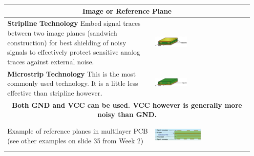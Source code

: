 		\begin{table}[h!]
		\centering
		\begin{tabular}{|m{}|m{}|}
				\multicolumn{2}{c}{\textbf{Image or Reference Plane}}
			\\
			\hline
				\textbf{Stripline Technology}\newline
				Embed signal traces between two image planes (sandwich construction) for best shielding of noisy signals to effectively protect sensitive analog traces against external noise. 
			& 
				 \begin{center}\includegraphics[width=0.35\textwidth]{images/StriplineTechnology.png}\end{center}  
			\\
			\hline
				\textbf{Microstrip Technology}\newline
				This is the most commonly used technology. It is a little less effective than stripline however.  
			& 
				 \begin{center}\includegraphics[width=0.35\textwidth]{images/MicrostripTechnology.png}\end{center}  
			\\
			\hline
				\multicolumn{2}{c}{\textbf{Both GND and VCC can be used. VCC however is generally more noisy than GND.}}
			\\
			\hline
				Example of reference planes in multilayer PCB (see other examples on slide 35 from Week 2) 
			& 
				 \begin{center}\includegraphics[width=0.5\textwidth]{images/ExampleReferenceLayer.png}\end{center}  
			\\
			\hline
			\end{tabular}
		\end{table}	
		
